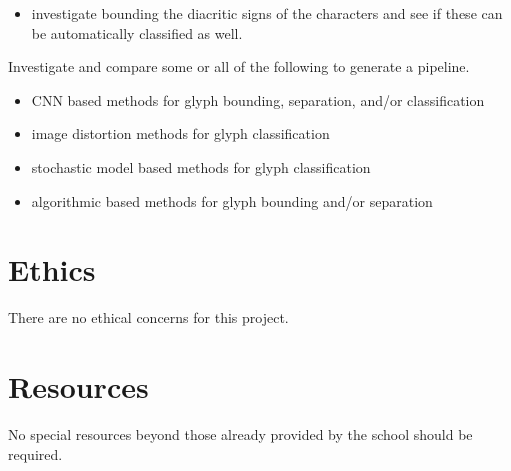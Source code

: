 \documentclass[12pt,a4paper,final]{article}
\begin{document}
\begin{itemize}
  \item investigate bounding the diacritic signs of the characters and see if these can be automatically classified as well.
\end{itemize}

Investigate and compare some or all of the following to generate a pipeline.

\begin{itemize}
  \item CNN based methods for glyph bounding, separation, and/or classification
  \item image distortion methods for glyph classification
  \item stochastic model based methods for glyph classification
  \item algorithmic based methods for glyph bounding and/or separation
\end{itemize}

\section{Ethics}
There are no ethical concerns for this project.

\section{Resources}
No special resources beyond those already provided by the school should be required.

\printbibliography[heading=bibintoc, title={References}]
\end{document}
